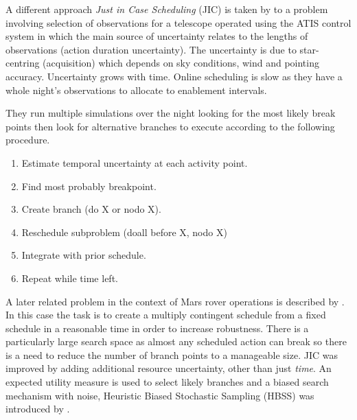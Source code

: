 
A different approach \emph{Just in Case Scheduling} (JIC) is taken by \citet{bresina94jic, drummond94jic} to a problem involving selection of observations for a telescope operated using the ATIS control system in which the main source of uncertainty relates to the lengths of observations (action duration uncertainty). The uncertainty is due to star-centring (acquisition) which depends on sky conditions, wind and pointing accuracy. Uncertainty grows with time. Online scheduling is slow as they have a whole night's observations to allocate to enablement intervals. 

They run multiple simulations over the night looking for the most likely break points then look for alternative branches to execute according to the following procedure.

\begin{enumerate}
\item Estimate temporal uncertainty at each activity point.
\item Find most probably breakpoint.
\item Create branch (do X or nodo X).
\item Reschedule subproblem (doall before X, nodo X)
\item Integrate with prior schedule.
\item Repeat while time left.
\end{enumerate}



 A later related problem in the context of Mars rover operations is described by \citet{bresina99increased}. In this case the task is to create a multiply contingent schedule from a fixed schedule in a reasonable time in order to increase robustness. There is a particularly large search space as almost any scheduled action can break so there is a need to reduce the number of branch points to a manageable size. JIC was improved by adding additional resource uncertainty, other than just \emph{time}. An expected utility measure is used to select likely branches and a biased search mechanism with noise, Heuristic Biased Stochastic Sampling (HBSS) was introduced by \citet{bresina96hbss}.
 
%
%

